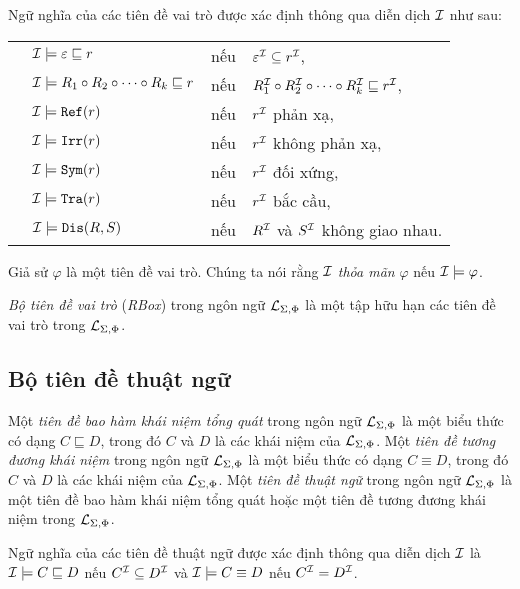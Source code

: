Ngữ nghĩa của các tiên đề vai trò được xác định thông qua diễn dịch $\mathcal{I}$ như sau:\\[1.5ex]
\begin{tabular}{c l c l}
	& $\mathcal{I} \models \varepsilon \sqsubseteq r$ & nếu & $\varepsilon^{\mathcal{I}} \subseteq r^{\mathcal{I}}$,\\[0.5ex]
	& $\mathcal{I} \models R_1 \circ R_2 \circ \cdots \circ R_k \sqsubseteq r$ & nếu & $R_1^{\mathcal{I}} \circ R_2^{\mathcal{I}} \circ \cdots \circ R_k^{\mathcal{I}} \sqsubseteq r^{\mathcal{I}}$,\\[0.5ex]
	& $\mathcal{I} \models \mathtt{Ref}(r)$ & nếu & $r^{\mathcal{I}}$ phản xạ,\\[0.5ex]
	& $\mathcal{I} \models \mathtt{Irr}(r)$ & nếu & $r^{\mathcal{I}}$ không phản xạ,\\[0.5ex]
	& $\mathcal{I} \models \mathtt{Sym}(r)$ & nếu & $r^{\mathcal{I}}$ đối xứng,\\[0.5ex]
	& $\mathcal{I} \models \mathtt{Tra}(r)$ & nếu & $r^{\mathcal{I}}$ bắc cầu,\\[0.5ex]
	& $\mathcal{I} \models \mathtt{Dis}(R,S)$ & nếu & $R^{\mathcal{I}}$ và $S^{\mathcal{I}}$ không giao nhau.
\end{tabular}

Giả sử $\varphi$ là một tiên đề vai trò. Chúng ta nói rằng $\mathcal{I}$ {\em thỏa mãn} $\varphi$ nếu $\mathcal{I} \models \varphi$.

\begin{Definition}
\label{def:RBox}
	{\em Bộ tiên đề vai trò} ({\em RBox}) trong ngôn ngữ $\mathcal{L}_{\Sigma,\Phi}$ là một tập hữu hạn các tiên đề vai trò trong $\mathcal{L}_{\Sigma,\Phi}$.\myend
\end{Definition}

\subsection{Bộ tiên đề thuật ngữ}
\label{sec:Chap1.TBox}
\begin{Definition}
\label{def:TerminologyAxiom}
	Một {\em tiên đề bao hàm khái niệm tổng quát} trong ngôn ngữ $\mathcal{L}_{\Sigma,\Phi}$ là một biểu thức có dạng $C \sqsubseteq D$, trong đó $C$ và $D$ là các khái niệm của $\mathcal{L}_{\Sigma,\Phi}$. 
%
	Một {\em tiên đề tương đương khái niệm} trong ngôn ngữ $\mathcal{L}_{\Sigma,\Phi}$ là một biểu thức có dạng $C \equiv D$, trong đó $C$ và $D$ là các khái niệm của $\mathcal{L}_{\Sigma,\Phi}$. 
%
	Một {\em tiên đề thuật ngữ} trong ngôn ngữ $\mathcal{L}_{\Sigma,\Phi}$ là một tiên đề bao hàm khái niệm tổng quát hoặc một tiên đề tương đương khái niệm trong $\mathcal{L}_{\Sigma,\Phi}$.\myend
\end{Definition}

Ngữ nghĩa của các tiên đề thuật ngữ được xác định thông qua diễn dịch $\mathcal{I}$ là $\mathcal{I} \models C \sqsubseteq D$ nếu $C^{\mathcal{I}} \subseteq D^{\mathcal{I}}$ và $\mathcal{I} \models C \equiv D$ nếu $C^{\mathcal{I}} = D^{\mathcal{I}}$.

